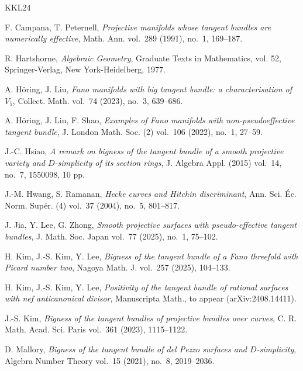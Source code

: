 \documentclass[reqno]{amsart}
\theoremstyle{definition}
\begin{document}
\begin{thebibliography}{KKL24}

    F. Campana, T. Peternell,
    \textit{Projective manifolds whose tangent bundles are numerically effective},
    Math. Ann.
    vol.~289 (1991),
    no.~1,
    169--187.

    R. Hartshorne,
    \textit{Algebraic Geometry},
    Graduate Texts in Mathematics,
    vol. 52,
    Springer-Verlag,
    New York-Heidelberg,
    1977.

    A. H\"{o}ring, J. Liu,
    \textit{Fano manifolds with big tangent bundle: a characterisation of $V_5$},
    Collect. Math.
    vol.~74 (2023),
    no.~3,
    639--686.

    A. H\"{o}ring, J. Liu, F. Shao,
    \textit{Examples of Fano manifolds with non-pseudoeffective tangent bundle},
    J. London Math. Soc. (2)
    vol.~106 (2022),
    no.~1,
    27--59.

    J.-C. Hsiao,
    \textit{A remark on bigness of the tangent bundle of a smooth projective variety and $D$-simplicity of its section rings},
    J. Algebra Appl. (2015)
    vol.~14,
    no.~7,
    1550098, 10 pp.

    J.-M. Hwang, S. Ramanan,
    \textit{Hecke curves and Hitchin discriminant},
    Ann. Sci. \'{E}c. Norm. Sup\'{e}r. (4)
    vol.~37 (2004),
    no.~5,
    801--817.

    J. Jia, Y. Lee, G. Zhong,
    \textit{Smooth projective surfaces with pseudo-effective tangent bundles},
    J. Math. Soc. Japan
    vol.~77 (2025),
    no.~1,
    75--102.

    H. Kim, J.-S. Kim, Y. Lee,
    \textit{Bigness of the tangent bundle of a Fano threefold with Picard number two},
    Nagoya Math. J.
    vol.~257 (2025),
    104--133.

    H. Kim, J.-S. Kim, Y. Lee,
    \textit{Positivity of the tangent bundle of rational surfaces with nef anticanonical divisor},
    Manuscripta Math.,
    to appear (arXiv:2408.14411).

    J.-S. Kim,
    \textit{Bigness of the tangent bundles of projective bundles over curves},
    C. R. Math. Acad. Sci. Paris
    vol.~361 (2023),
    1115--1122.

    D. Mallory,
    \textit{Bigness of the tangent bundle of del Pezzo surfaces and $D$-simplicity},
    Algebra Number Theory
    vol.~15 (2021),
    no.~8,
    2019--2036.


\end{thebibliography}
\end{document}
